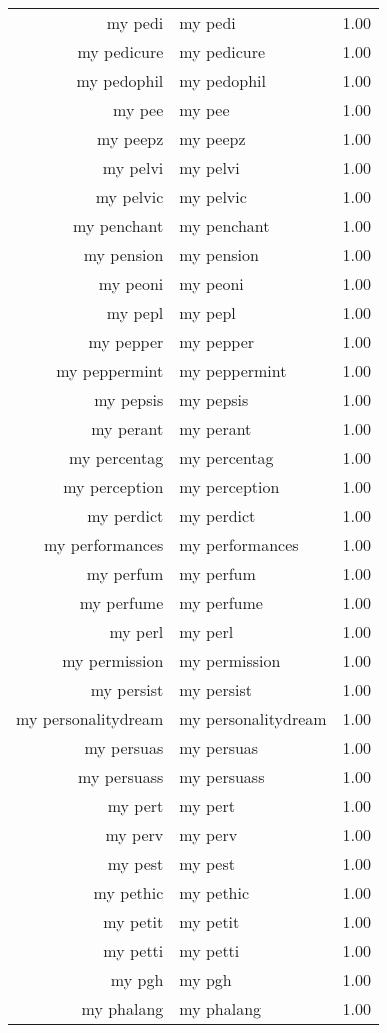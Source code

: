 \begin{table}[ht]
\begin{tabular}{rlr}
  my pedi & my pedi & 1.00 \\ 
  my pedicure & my pedicure & 1.00 \\ 
  my pedophil & my pedophil & 1.00 \\ 
  my pee & my pee & 1.00 \\ 
  my peepz & my peepz & 1.00 \\ 
  my pelvi & my pelvi & 1.00 \\ 
  my pelvic & my pelvic & 1.00 \\ 
  my penchant & my penchant & 1.00 \\ 
  my pension & my pension & 1.00 \\ 
  my peoni & my peoni & 1.00 \\ 
  my pepl & my pepl & 1.00 \\ 
  my pepper & my pepper & 1.00 \\ 
  my peppermint & my peppermint & 1.00 \\ 
  my pepsis & my pepsis & 1.00 \\ 
  my perant & my perant & 1.00 \\ 
  my percentag & my percentag & 1.00 \\ 
  my perception & my perception & 1.00 \\ 
  my perdict & my perdict & 1.00 \\ 
  my performances & my performances & 1.00 \\ 
  my perfum & my perfum & 1.00 \\ 
  my perfume & my perfume & 1.00 \\ 
  my perl & my perl & 1.00 \\ 
  my permission & my permission & 1.00 \\ 
  my persist & my persist & 1.00 \\ 
  my personalitydream & my personalitydream & 1.00 \\ 
  my persuas & my persuas & 1.00 \\ 
  my persuass & my persuass & 1.00 \\ 
  my pert & my pert & 1.00 \\ 
  my perv & my perv & 1.00 \\ 
  my pest & my pest & 1.00 \\ 
  my pethic & my pethic & 1.00 \\ 
  my petit & my petit & 1.00 \\ 
  my petti & my petti & 1.00 \\ 
  my pgh & my pgh & 1.00 \\ 
  my phalang & my phalang & 1.00 \\ 

\end{tabular}
\end{table}
